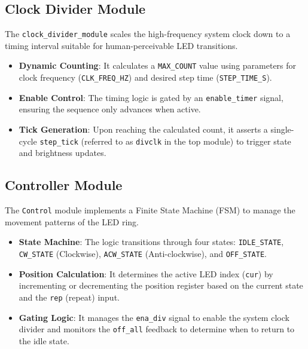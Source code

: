 \subsection{Clock Divider Module}
The \texttt{clock\_divider\_module} scales the high-frequency system clock down to a timing interval suitable for human-perceivable LED transitions.
\begin{itemize}[noitemsep]
    \item \textbf{Dynamic Counting}: It calculates a \texttt{MAX\_COUNT} value using parameters for clock frequency (\texttt{CLK\_FREQ\_HZ}) and desired step time (\texttt{STEP\_TIME\_S}).
    \item \textbf{Enable Control}: The timing logic is gated by an \texttt{enable\_timer} signal, ensuring the sequence only advances when active.
    \item \textbf{Tick Generation}: Upon reaching the calculated count, it asserts a single-cycle \texttt{step\_tick} (referred to as \texttt{divclk} in the top module) to trigger state and brightness updates.
\end{itemize}

\subsection{ Controller Module}
The \texttt{Control} module implements a Finite State Machine (FSM) to manage the movement patterns of the LED ring.
\begin{itemize}[noitemsep]
    \item \textbf{State Machine}: The logic transitions through four states: \texttt{IDLE\_STATE}, \texttt{CW\_STATE} (Clockwise), \texttt{ACW\_STATE} (Anti-clockwise), and \texttt{OFF\_STATE}.
    \item \textbf{Position Calculation}: It determines the active LED index (\texttt{cur}) by incrementing or decrementing the position register based on the current state and the \texttt{rep} (repeat) input.
    \item \textbf{Gating Logic}: It manages the \texttt{ena\_div} signal to enable the system clock divider and monitors the \texttt{off\_all} feedback to determine when to return to the idle state.
\end{itemize}

